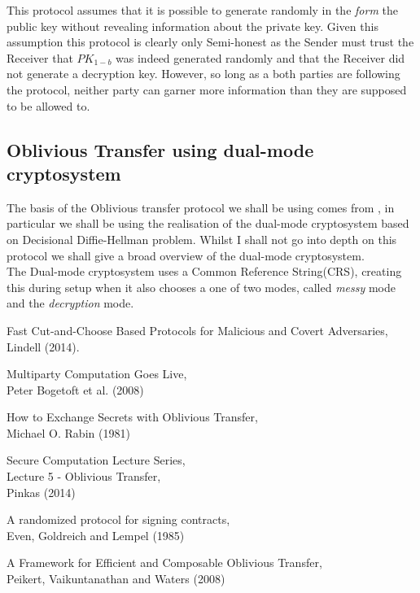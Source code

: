 \documentclass[a4paper,10pt]{article}
\begin{document}
      This protocol assumes that it is possible to generate randomly in the \emph{form} the public key without revealing information about the private key. Given this assumption this protocol is clearly only Semi-honest as the Sender must trust the Receiver that $PK_{1-b}$ was indeed generated randomly and that the Receiver did not generate a decryption key. However, so long as a both parties are following the protocol, neither party can garner more information than they are supposed to be allowed to.
 
    \subsection{Oblivious Transfer using dual-mode cryptosystem}
      The basis of the Oblivious transfer protocol we shall be using comes from \cite{PVW_OT_2008}, in particular we shall be using the realisation of the dual-mode cryptosystem based on Decisional Diffie-Hellman problem. Whilst I shall not go into depth on this protocol we shall give a broad overview of the dual-mode cryptosystem.\\

      The Dual-mode cryptosystem uses a Common Reference String(CRS), creating this during setup when it also chooses a one of two modes, called \emph{messy} mode and the \emph{decryption} mode.



\begin{thebibliography}{5}
    Fast Cut-and-Choose Based Protocols for Malicious and Covert Adversaries,\\
    Lindell (2014).

    Multiparty Computation Goes Live,\\
    Peter Bogetoft et al. (2008)

    How to Exchange Secrets with Oblivious Transfer,\\
    Michael O. Rabin (1981)

    Secure Computation Lecture Series,\\
    Lecture 5 - Oblivious Transfer,\\
    Pinkas (2014)

    A randomized protocol for signing contracts,\\
    Even, Goldreich and Lempel (1985)

    A Framework for Efficient and Composable Oblivious Transfer,\\
    Peikert, Vaikuntanathan and Waters (2008)

\end{thebibliography}
\end{document}
